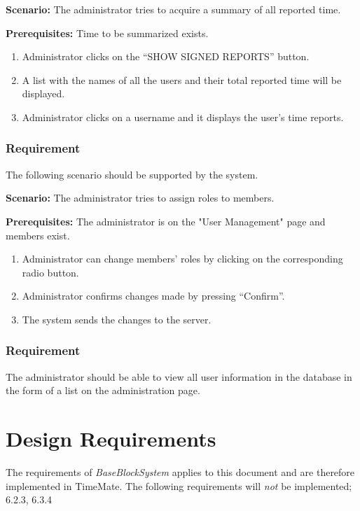 \documentclass{article}
\begin{document}
\textbf{Scenario:} The administrator tries to acquire a summary of all reported time.

\textbf{Prerequisites:} Time to be summarized exists.

\begin{enumerate}
    \item Administrator clicks on the “SHOW SIGNED REPORTS” button.
    \item A list with the names of all the users and their total reported time will be displayed.
    \item Administrator clicks on a username and it displays the user’s time reports.
\end{enumerate}

\subsubsection{Requirement}
The following scenario should be supported by the system.

\textbf{Scenario:} The administrator tries to assign roles to members.

\textbf{Prerequisites:} The administrator is on the "User Management" page and members exist.

\begin{enumerate}
    \item Administrator can change members' roles by clicking on the corresponding radio button.
    \item Administrator confirms changes made by pressing “Confirm”.
    \item The system sends the changes to the server.
    
\end{enumerate}

\subsubsection{Requirement}
The administrator should be able to view all user information in the database in the form of a list on the administration page. 

\section{Design Requirements}
\item The requirements of \emph{BaseBlockSystem} applies to this document and are therefore implemented in TimeMate. The following requirements will \emph{not} be implemented; 6.2.3, 6.3.4
\end{document}
